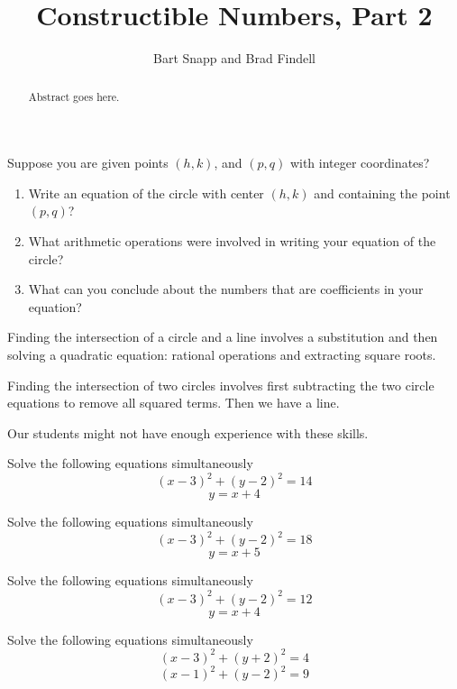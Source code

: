 \documentclass{ximera}
\title{Constructible Numbers, Part 2}
\author{Bart Snapp and Brad Findell}
\begin{document}
\begin{abstract}
Abstract goes here.  
\end{abstract}
\maketitle

\begin{problem}
Suppose you are given points $(h, k)$, and $(p, q)$ with integer coordinates?  
\begin{enumerate}
\item Write an equation of the circle with center $(h, k)$ and containing the point $(p, q)$?  
\item What arithmetic operations were involved in writing your equation of the circle?  
\item What can you conclude about the numbers that are coefficients in your equation?   
\end{enumerate}
\end{problem}

\begin{teachingnote}
Finding the intersection of a circle and a line involves a substitution and then solving a quadratic equation:  rational operations and extracting square roots.  

Finding the intersection of two circles involves first subtracting the two circle equations to remove all squared terms.  Then we have a line.  

Our students might not have enough experience with these skills.  
\end{teachingnote}

\begin{problem}
Solve the following equations simultaneously
$$(x-3)^2+(y-2)^2 = 14$$
$$ y = x + 4$$
\end{problem}


\begin{problem}
Solve the following equations simultaneously
$$(x-3)^2+(y-2)^2 = 18$$
$$ y = x + 5$$
\end{problem}

\begin{problem}
Solve the following equations simultaneously
$$(x-3)^2+(y-2)^2 = 12$$
$$ y = x + 4$$
\end{problem}


\begin{problem}
Solve the following equations simultaneously
$$(x-3)^2+(y+2)^2 = 4$$
$$(x-1)^2+(y-2)^2 = 9$$
\end{problem}
\end{document}
